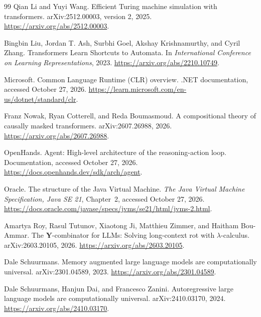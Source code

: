 \documentclass[11pt,twoside]{article}
\theoremstyle{definition}
\theoremstyle{remark}
\begin{document}
\begin{thebibliography}{99}
Qian Li and Yuyi Wang.
\newblock Efficient Turing machine simulation with transformers.
\newblock arXiv:2512.00003, version 2, 2025.
\newblock \url{https://arxiv.org/abs/2512.00003}.

Bingbin Liu, Jordan T. Ash, Surbhi Goel, Akshay Krishnamurthy, and Cyril Zhang.
\newblock Transformers Learn Shortcuts to Automata.
\newblock In \emph{International Conference on Learning Representations}, 2023.
\newblock \url{https://arxiv.org/abs/2210.10749}.

Microsoft.
\newblock Common Language Runtime (CLR) overview.
\newblock .NET documentation, accessed October 27, 2026.
\newblock \url{https://learn.microsoft.com/en-us/dotnet/standard/clr}.

Franz Nowak, Ryan Cotterell, and Reda Boumasmoud.
\newblock A compositional theory of causally masked transformers.
\newblock arXiv:2607.26988, 2026.
\newblock \url{https://arxiv.org/abs/2607.26988}.

OpenHands.
\newblock Agent: High-level architecture of the reasoning-action loop.
\newblock Documentation, accessed October 27, 2026.
\newblock \url{https://docs.openhands.dev/sdk/arch/agent}.

Oracle.
\newblock The structure of the Java Virtual Machine.
\newblock \emph{The Java Virtual Machine Specification, Java SE 21},
Chapter~2, accessed October 27, 2026.
\newblock \url{https://docs.oracle.com/javase/specs/jvms/se21/html/jvms-2.html}.

Amartya Roy, Rasul Tutunov, Xiaotong Ji, Matthieu Zimmer,
and Haitham Bou-Ammar.
\newblock The $\mathbf Y$-combinator for LLMs: Solving long-context rot
with $\lambda$-calculus.
\newblock arXiv:2603.20105, 2026.
\newblock \url{https://arxiv.org/abs/2603.20105}.

Dale Schuurmans.
\newblock Memory augmented large language models are computationally universal.
\newblock arXiv:2301.04589, 2023.
\newblock \url{https://arxiv.org/abs/2301.04589}.

Dale Schuurmans, Hanjun Dai, and Francesco Zanini.
\newblock Autoregressive large language models are computationally universal.
\newblock arXiv:2410.03170, 2024.
\newblock \url{https://arxiv.org/abs/2410.03170}.


\end{thebibliography}
\end{document}
